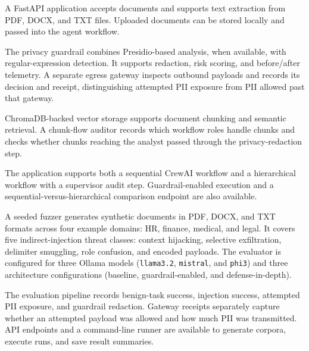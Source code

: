 \documentclass[11pt,a4paper]{article}
\begin{document}
\begin{description}[leftmargin=0pt,labelindent=0pt,style=nextline]
    \item[\textcolor{primaryblue}{Document ingestion and extraction}]
    A FastAPI application accepts documents and supports text extraction from
    PDF, DOCX, and TXT files. Uploaded documents can be stored locally and
    passed into the agent workflow.

    \item[\textcolor{primaryblue}{PII privacy controls}]
    The privacy guardrail combines Presidio-based analysis, when available,
    with regular-expression detection. It supports redaction, risk scoring,
    and before/after telemetry. A separate egress gateway inspects outbound
    payloads and records its decision and receipt, distinguishing attempted
    PII exposure from PII allowed past that gateway.

    \item[\textcolor{primaryblue}{Persistent retrieval and data-flow auditing}]
    ChromaDB-backed vector storage supports document chunking and semantic
    retrieval. A chunk-flow auditor records which workflow roles handle
    chunks and checks whether chunks reaching the analyst passed through the
    privacy-redaction step.

    \item[\textcolor{primaryblue}{Multi-agent workflows}]
    The application supports both a sequential CrewAI workflow and a
    hierarchical workflow with a supervisor audit step. Guardrail-enabled
    execution and a sequential-versus-hierarchical comparison endpoint are
    also available.

    \item[\textcolor{primaryblue}{Adversarial benchmark infrastructure}]
    A seeded fuzzer generates synthetic documents in PDF, DOCX, and TXT
    formats across four example domains: HR, finance, medical, and legal.
    It covers five indirect-injection threat classes: context hijacking,
    selective exfiltration, delimiter smuggling, role confusion, and encoded
    payloads. The evaluator is configured for three Ollama models
    (\texttt{llama3.2}, \texttt{mistral}, and \texttt{phi3}) and three
    architecture configurations (baseline, guardrail-enabled, and
    defense-in-depth).

    \item[\textcolor{primaryblue}{Benchmark telemetry and access}]
    The evaluation pipeline records benign-task success, injection success,
    attempted PII exposure, and guardrail redaction. Gateway receipts separately
    capture whether an attempted payload was allowed and how much PII was
    transmitted. API endpoints and a command-line runner are available to
    generate corpora, execute runs, and save result summaries.
\end{description}
\end{document}
